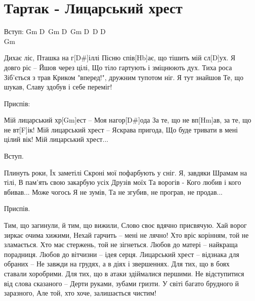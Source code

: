\section{Тартак - Лицарський хрест}
\begin{guitar}
\begin{flushleft}
\begin{tabbing}
Вступ: \=Gm D\guitarSharp\ Gm D\guitarSharp\ Gm D\guitarSharp\ D D\guitarSharp\ \\
       \>Gm\\
\end{tabbing}

Дихає ліс,
Пташка на г[D#]іллі
Пісню спів[Hb]ає, що тішить мій сл[D]ух.
Я довго ріс – 
Йшов через цілі,
Що тіло гартують і зміцнюють дух.
Тиха роса
Зіб'ється з трав
Криком "вперед!", дружним тупотом ніг.
Я тут знайшов
Те, що шукав,
Славу здобув і себе переміг!

Приспів:

Мій лицарський хр[Gm]ест – 
Моя нагор[D#]ода
За те, що не вп[Hm]ав, за те, що не вт[F]ік!
Мій лицарський хрест – 
Яскрава пригода,
Що буде тривати в мені цілий вік!
Мій лицарський хрест...

Вступ.

Плинуть роки,
Їх заметілі
Скроні мої пофарбують у сніг.
Я, завдяки
Шрамам на тілі,
В пам'ять свою закарбую усіх
Друзів моїх 
Та ворогів -
Кого любив і кого вбивав...
Може чогось
Я не зумів,
Та не згубив, не програв, не продав...

Приспів.

Тим, що загинули, й тим, що вижили,
Слово своє вдячно присвячую.
Хай ворог зиркає очима хижими,
Нехай гарчить – мені не лячно!
Хто вріс корінням, той не зламається.
Хто має стержень, той не зігнеться.
Любов до матері – найкраща порадниця.
Любов до вітчизни – ідея серця.
Лицарський хрест – відзнака для обраних – 
Не завжди на грудях, а в діях і звершеннях.
Для тих, що в боях ставали хоробрими.
Для тих, що в атаки здіймалися першими.
Не відступитися від слова сказаного – 
Дерти руками, зубами гризти.
У світі багато брудного й заразного,
Але той, хто хоче, залишається чистим!
\end{flushleft}

\end{guitar}